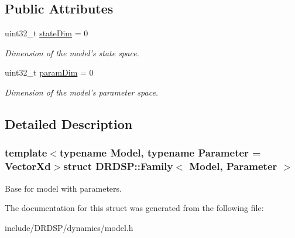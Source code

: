 \subsection*{Public Attributes}
\begin{DoxyCompactItemize}
\item 
\hypertarget{struct_d_r_d_s_p_1_1_family_ae2e7aabde5a620540f4771f1fac6da78}{uint32\-\_\-t \hyperlink{struct_d_r_d_s_p_1_1_family_ae2e7aabde5a620540f4771f1fac6da78}{state\-Dim} = 0}\label{struct_d_r_d_s_p_1_1_family_ae2e7aabde5a620540f4771f1fac6da78}

\begin{DoxyCompactList}\small\item\em Dimension of the model's state space. \end{DoxyCompactList}\item 
\hypertarget{struct_d_r_d_s_p_1_1_family_a364eac2f469c96b1584ffbd66ea49e81}{uint32\-\_\-t \hyperlink{struct_d_r_d_s_p_1_1_family_a364eac2f469c96b1584ffbd66ea49e81}{param\-Dim} = 0}\label{struct_d_r_d_s_p_1_1_family_a364eac2f469c96b1584ffbd66ea49e81}

\begin{DoxyCompactList}\small\item\em Dimension of the model's parameter space. \end{DoxyCompactList}\end{DoxyCompactItemize}


\subsection{Detailed Description}
\subsubsection*{template$<$typename Model, typename Parameter = Vector\-Xd$>$struct D\-R\-D\-S\-P\-::\-Family$<$ Model, Parameter $>$}

Base for model with parameters. 

The documentation for this struct was generated from the following file\-:\begin{DoxyCompactItemize}
\item 
include/\-D\-R\-D\-S\-P/dynamics/model.\-h\end{DoxyCompactItemize}
